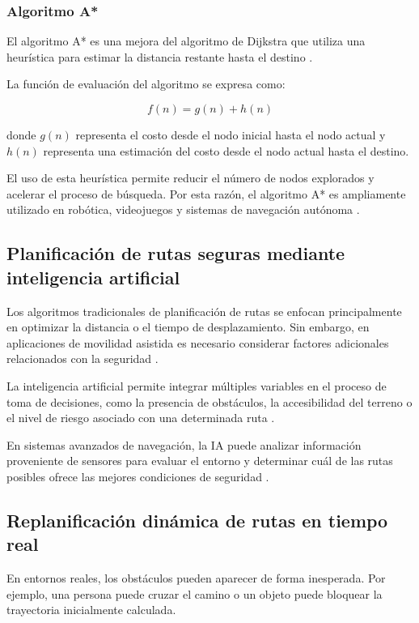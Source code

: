 \subsubsection{Algoritmo A*}

El algoritmo A* es una mejora del algoritmo de Dijkstra que utiliza una heurística para estimar la distancia restante hasta el destino \cite{hart1968astar}.

La función de evaluación del algoritmo se expresa como:

\[
f(n) = g(n) + h(n)
\]

donde $g(n)$ representa el costo desde el nodo inicial hasta el nodo actual y $h(n)$ representa una estimación del costo desde el nodo actual hasta el destino.

El uso de esta heurística permite reducir el número de nodos explorados y acelerar el proceso de búsqueda. Por esta razón, el algoritmo A* es ampliamente utilizado en robótica, videojuegos y sistemas de navegación autónoma \cite{hart1968astar, lavalle2006planning}.

\subsection{Planificación de rutas seguras mediante inteligencia artificial}

Los algoritmos tradicionales de planificación de rutas se enfocan principalmente en optimizar la distancia o el tiempo de desplazamiento. Sin embargo, en aplicaciones de movilidad asistida es necesario considerar factores adicionales relacionados con la seguridad \cite{thrun2005probabilistic}.

La inteligencia artificial permite integrar múltiples variables en el proceso de toma de decisiones, como la presencia de obstáculos, la accesibilidad del terreno o el nivel de riesgo asociado con una determinada ruta \cite{ganesan2025_common_ai_cheatsheet}.

En sistemas avanzados de navegación, la IA puede analizar información proveniente de sensores para evaluar el entorno y determinar cuál de las rutas posibles ofrece las mejores condiciones de seguridad \cite{fox1997dynamic}.

\subsection{Replanificación dinámica de rutas en tiempo real}

En entornos reales, los obstáculos pueden aparecer de forma inesperada. Por ejemplo, una persona puede cruzar el camino o un objeto puede bloquear la trayectoria inicialmente calculada.


